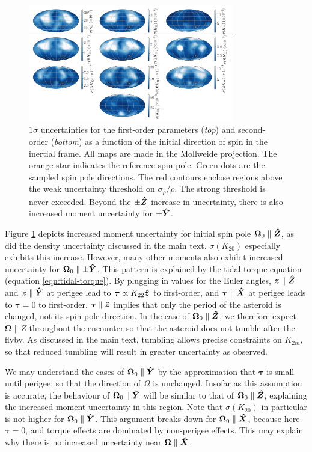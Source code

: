 \begin{figure}
  \centering
  \includegraphics[width=0.8\textwidth]{figs/spin-pole.png}
  \caption{$1\sigma$ uncertainties for the first-order parameters (\textit{top}) and second-order (\textit{bottom}) as a function of the initial direction of spin in the inertial frame. All maps are made in the Mollweide projection. The orange star indicates the reference spin pole. Green dots are the sampled spin pole directions. The red contours enclose regions above the weak uncertainty threshold on $\sigma_\rho / \rho$. The strong threshold is never exceeded. Beyond the $\pm \bm{\hat{Z}}$ increase in uncertainty, there is also increased moment uncertainty for $\pm \bm{\hat{Y}}$.}
  \label{fig:scan-spin}
\end{figure}

Figure \ref{fig:scan-spin} depicts increased moment uncertainty for initial spin pole $\bm \Omega_0 \parallel \bm{\hat{Z}}$, as did the density uncertainty discussed in the main text. $\sigma(K_{20})$ especially exhibits this increase. However, many other moments also exhibit increased uncertainty for $\bm \Omega_0 \parallel \pm \bm{\hat{Y}}$. This pattern is explained by the tidal torque equation (equation \ref{eqn:tidal-torque}). By plugging in values for the Euler angles, $\bm z \parallel \bm{\hat{Z}}$ and $\bm z \parallel \bm{\hat{Y}}$ at perigee lead to $\bm \tau \propto K_{22} \bm{\hat{z}}$ to first-order, and $\bm \tau \parallel \bm{\hat{X}}$ at perigee leads to $\bm \tau = 0$ to first-order. $\bm \tau \parallel \bm{\hat{z}}$ implies that only the period of the asteroid is changed, not its spin pole direction. In the case of $\bm \Omega_0 \parallel \bm{\hat{Z}}$, we therefore expect $\bm \Omega \parallel Z$ throughout the encounter so that the asteroid does not tumble after the flyby. As discussed in the main text, tumbling allows precise constraints on $K_{2m}$, so that reduced tumbling will result in greater uncertainty as observed.

We may understand the cases of $\bm \Omega_0 \parallel \bm{\hat{Y}}$ by the approximation that $\bm \tau$ is small until perigee, so that the direction of $\Omega$ is unchanged. Insofar as this assumption is accurate, the behaviour of $\bm \Omega_0 \parallel \bm{\hat{Y}}$ will be similar to that of $\bm \Omega_0 \parallel \bm{\hat{Z}}$, explaining the increased moment uncertainty in this region. Note that $\sigma(K_{20})$ in particular is not higher for $\bm \Omega_0 \parallel \bm{\hat{Y}}$. This argument breaks down for $\bm \Omega_0 \parallel \bm{\hat{X}}$, because here $\bm \tau = 0$, and torque effects are dominated by non-perigee effects. This may explain why there is no increased uncertainty near $\bm \Omega \parallel \bm{\hat{X}}$.



